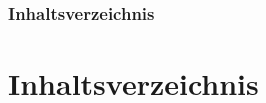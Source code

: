 \begin{frame}
\frametitle{Inhaltsverzeichnis}
\section{Inhaltsverzeichnis}
\tableofcontents
\end{frame}